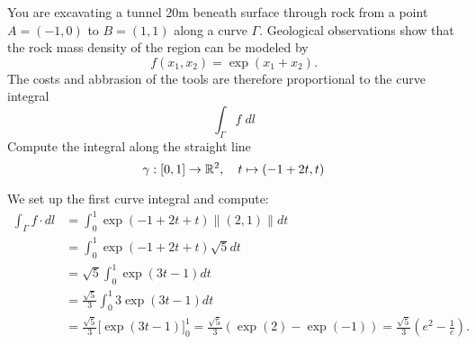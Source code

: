 \documentclass[11pt]{article}
\begin{document}
\begin{exercise}
    You are excavating a tunnel 20m beneath surface through rock from a point $A=(-1,0)$ to $B=(1,1)$ along a curve $\Gamma$.
    Geological observations show that the rock mass density of the region can be modeled by 
    \[
        f(x_1,x_2) = \exp(x_1+x_2).
    \]
    The costs and abbrasion of the tools are therefore proportional to the curve integral
    \[
        \int_\Gamma f \; dl
    \]
    Compute the integral along the straight line 
    \[
        \gamma : [0,1] \rightarrow \mathbb{R}^2, \quad t \mapsto (-1+2t, t)
    \]
\end{exercise}
\begin{solution}
    We set up the first curve integral and compute:
    \begin{align*}
        \int_\Gamma f \cdot dl
        &=
        \int_0^1 \exp(-1+2t+t) \|(2,1)\| dt
        \\&=
        \int_0^1 \exp(-1+2t+t) \sqrt{5} dt
        \\&=
        \sqrt{5} \int_0^1 \exp(3t-1) dt
        \\&=
        \frac{\sqrt{5}}{3} 
        \int_0^1 3 \exp(3t-1) dt
        \\&=
        \frac{\sqrt{5}}{3} 
        \Big[ \exp(3t-1) \Big]_0^1
        =
        \frac{\sqrt{5}}{3} 
        \left( \exp(2) - \exp(-1) \right)
        =
        \frac{\sqrt{5}}{3} 
        \left( e^2 - \frac{1}{e} \right)
        .
    \end{align*}
\end{solution}




\end{document}
